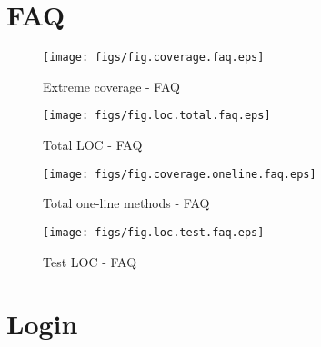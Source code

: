 \clearpage


\section {FAQ}

\begin{figure}[htbp]
  \begin{minipage}[htbp]{.45\linewidth}
    \begin{center}
      \texttt{[image: figs/fig.coverage.faq.eps]}
      \caption{Extreme coverage - FAQ}
      \label{fig:coverage.faq}
    \end{center}
  \end{minipage}
\hfill
  \begin{minipage}[htbp]{.45\linewidth}
    \begin{center}
      \texttt{[image: figs/fig.loc.total.faq.eps]}
      \caption{Total LOC - FAQ}
      \label{fig:loc.total.faq}
    \end{center}
  \end{minipage}
\end{figure}

\begin{figure}[htbp]
  \begin{minipage}[htbp]{.45\linewidth}
    \begin{center}
      \texttt{[image: figs/fig.coverage.oneline.faq.eps]}
      \caption{Total one-line methods - FAQ}
      \label{fig:coverage.oneline.test.faq}
    \end{center}
  \end{minipage}
\hfill
  \begin{minipage}[htbp]{.45\linewidth}
    \begin{center}
      \texttt{[image: figs/fig.loc.test.faq.eps]}
      \caption{Test LOC - FAQ}
      \label{fig:loc.test.faq}
    \end{center}
  \end{minipage}
\end{figure}

\clearpage


\section {Login}

